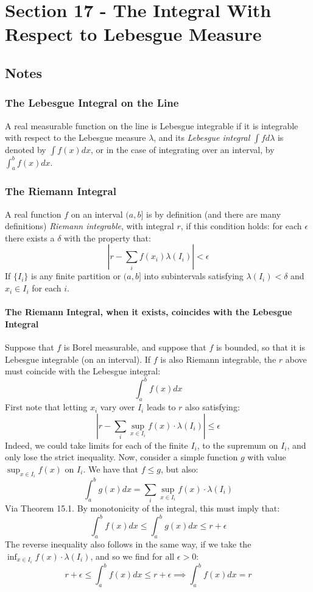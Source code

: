 \documentclass[12pt,a4paper]{article}
\newcommand{\1}[1]{\mathbbm{1}\left\{ #1 \right\}}
\begin{document}
\section{Section 17 - The Integral With Respect to Lebesgue Measure}
\subsection{Notes}
\subsubsection{The Lebesgue Integral on the Line}
A real measurable function on the line is Lebesgue integrable if it is integrable with respect to the Lebesgue measure $\lambda$, and its \textit{Lebesgue integral} $\int f d\lambda$ is denoted by $\int f(x) dx$, or in the case of integrating over an interval, by $\int_a^b f(x) dx$. 

\subsubsection{The Riemann Integral} A real function $f$ on an interval $(a,b]$ is by definition (and there are many definitions) \textit{Riemann integrable}, with integral $r$, if this condition holds: for each $\epsilon$ there exists a $\delta$ with the property that:
$$
	\left|r - \sum_i f(x_i)\lambda(I_i)\right| < \epsilon
$$
If $\{I_i\}$ is any finite partition or $(a,b]$ into subintervals satisfying $\lambda(I_i) < \delta$ and $x_i \in I_i$ for each $i$. 

\paragraph{The Riemann Integral, when it exists, coincides with the Lebesgue Integral} Suppose that $f$ is Borel measurable, and suppose that $f$ is bounded, so that it is Lebesgue integrable (on an interval). If $f$ is also Riemann integrable, the $r$ above must coincide with the Lebesgue integral:
$$
	\int_a^b f(x) dx
$$
First note that letting $x_i$ vary over $I_i$ leads to $r$ also satisfying:
$$
	\left|r - \sum_i \sup_{x \in I_i} f(x) \cdot \lambda(I_i)\right| \leq \epsilon
$$
Indeed, we could take limits for each of the finite $I_i$, to the supremum on $I_i$, and only lose the strict inequality. Now, consider a simple function $g$ with value $\sup_{x \in I_i} f(x)$ on $I_i$. We have that $f \leq g$, but also:
$$
	\int_a^b g(x) dx = \sum_i \sup_{x \in I_i} f(x) \cdot \lambda(I_i)
$$
Via Theorem 15.1. By monotonicity of the integral, this must imply that:
$$
	\int_a^b f(x) dx \leq \int_a^b g(x) dx \leq r + \epsilon
$$
The reverse inequality also follows in the same way, if we take the $\inf_{x \in I_i} f(x) \cdot \lambda(I_i)$, and so we find for all $\epsilon > 0$:
$$
	r + \epsilon \leq \int_a^b f(x) dx \leq r + \epsilon \implies
	\int_a^b f(x) dx = r
$$
\end{document}
